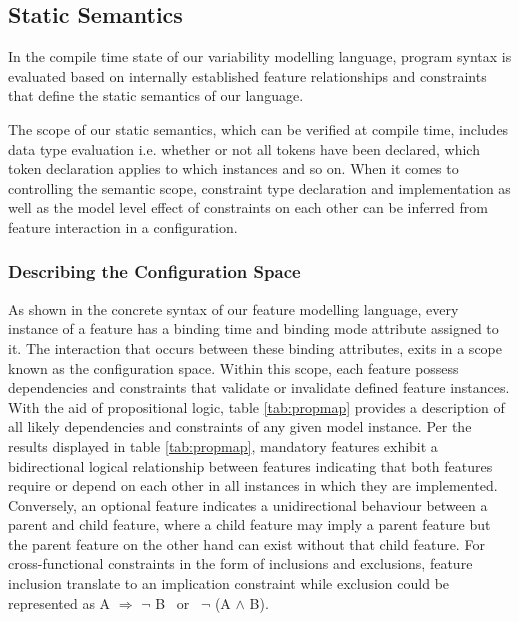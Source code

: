 \documentclass[conference]{IEEEtran}
\begin{document}
\subsection{Static Semantics}
In the compile time state of our variability modelling language, program syntax is evaluated based on internally established feature relationships and constraints that define the static semantics of our language.

The scope of our static semantics, which can be verified  at compile time, includes data type evaluation i.e. whether or not all tokens have been declared, which token declaration applies to which instances and so on. When it comes to controlling the semantic scope, constraint type declaration and implementation as well as the model level effect of constraints on each other can be inferred from feature interaction in a configuration.

\subsubsection{Describing the Configuration Space}
As shown in the concrete syntax of our feature modelling language, every instance of a feature has a binding time and binding mode attribute assigned to it. The interaction that occurs between these binding attributes, exits in a scope known as the configuration space. Within this scope, each feature possess dependencies and constraints that validate or invalidate defined feature instances. With the aid of propositional logic, table \ref{tab:propmap} provides a description of all likely dependencies and constraints of any given model instance. Per the results displayed in table \ref{tab:propmap}, mandatory features exhibit a bidirectional logical relationship between features indicating that both features require or depend on each other in all instances in which they are implemented. Conversely, an optional feature indicates a unidirectional behaviour between a parent and child feature, where a child feature may imply a parent feature but the parent feature on the other hand can exist without that child feature. For cross-functional constraints in the form of inclusions and exclusions, feature inclusion translate to an implication constraint while exclusion could be represented as  A $\Rightarrow$ $\neg$ B \ or \ $\neg$ (A $\land$ B).
\end{document}
